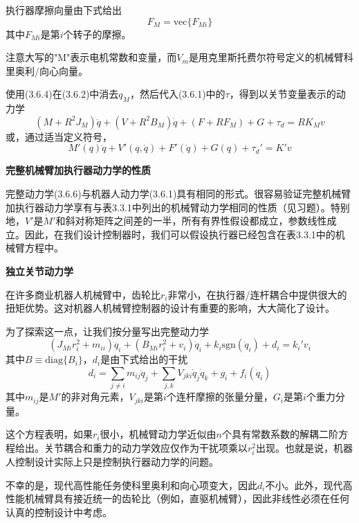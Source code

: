 \documentclass[12pt,a4paper]{ctexart}
\begin{document}
执行器摩擦向量由下式给出
\begin{equation}
F_M = \text{vec}\{F_{Mi}\}
\end{equation}
其中$F_{Mi}$是第$i$个转子的摩擦。

注意大写的"M"表示电机常数和变量，而$V_m$是用克里斯托费尔符号定义的机械臂科里奥利/向心向量。

使用(3.6.4)在(3.6.2)中消去$q_M$，然后代入(3.6.1)中的$\tau$，得到以关节变量表示的动力学
\begin{equation}
(M + R^2J_M)\ddot{q} + (V + R^2B_M)\dot{q} + (F + RF_M) + G + \tau_d = RK_M v
\end{equation}
或，通过适当定义符号，
\begin{equation}
M'(q)\ddot{q} + V'(q,\dot{q}) + F'(\dot{q}) + G(q) + \tau_d' = K'v
\end{equation}

\textbf{完整机械臂加执行器动力学的性质}

完整动力学(3.6.6)与机器人动力学(3.6.1)具有相同的形式。很容易验证完整机械臂加执行器动力学享有与表3.3.1中列出的机械臂动力学相同的性质（见习题）。特别地，$V'$是$\dot{M}'$和斜对称矩阵之间差的一半，所有有界性假设都成立，参数线性成立。因此，在我们设计控制器时，我们可以假设执行器已经包含在表3.3.1中的机械臂方程中。

\textbf{独立关节动力学}

在许多商业机器人机械臂中，齿轮比$r_i$非常小，在执行器/连杆耦合中提供很大的扭矩优势。这对机器人机械臂控制器的设计有重要的影响，大大简化了设计。

为了探索这一点，让我们按分量写出完整动力学
\begin{equation}
(J_{Mi}r_i^2 + m_{ii})\ddot{q}_i + (B_{Mi}r_i^2 + v_i)\dot{q}_i + k_i\text{sgn}(\dot{q}_i) + d_i = k_i'v_i
\end{equation}
其中$B \equiv \text{diag}\{B_i\}$，$d_i$是由下式给出的干扰
\begin{equation}
d_i = \sum_{j \neq i}m_{ij}\ddot{q}_j + \sum_{j,k}V_{jki}\dot{q}_j\dot{q}_k + g_i + f_i(\dot{q}_i)
\end{equation}
其中$m_{ij}$是$M'$的非对角元素，$V_{jki}$是第$i$个连杆摩擦的张量分量，$G_i$是第$i$个重力分量。

这个方程表明，如果$r_i$很小，机械臂动力学近似由$n$个具有常数系数的解耦二阶方程给出。关节耦合和重力的动力学效应仅作为干扰项乘以$r_i^2$出现。也就是说，机器人控制设计实际上只是控制执行器动力学的问题。

不幸的是，现代高性能任务使科里奥利和向心项变大，因此$d_i$不小。此外，现代高性能机械臂具有接近统一的齿轮比（例如，直驱机械臂），因此非线性必须在任何认真的控制设计中考虑。
\end{document}
